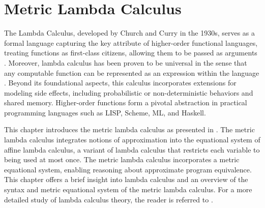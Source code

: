  

 





\chapter{Metric Lambda Calculus} \label{ch:metriclambda}


The Lambda Calculus, developed by Church and Curry in the 1930s, serves as a formal language capturing the key attribute of higher-order functional languages, treating functions as first-class citizens, allowing them to be passed as arguments \cite{barendregt1984lambda}.  Moreover, lambda calculus has been proven to be universal in the sense that any computable function can be represented as an expression within the language \cite{bernays1936alonzo} . Beyond its foundational aspects, this calculus incorporates extensions for modeling side effects, including probabilistic or non-deterministic behaviors and shared memory.  Higher-order functions form a pivotal abstraction in practical programming languages such as LISP, Scheme, ML, and Haskell.


This chapter introduces the metric lambda calculus as presented in \cite{dahlqvist2022syntactic}. The metric lambda calculus integrates notions of
approximation into the equational system of affine lambda calculus, a variant of lambda calculus that restricts each variable to being used at most once. The metric lambda calculus incorporates a metric equational system, enabling reasoning about approximate program equivalence. This chapter offers a brief insight into lambda calculus and an overview of the syntax and metric equational system of the metric lambda calculus. For a more detailed study of lambda calculus theory, the reader is referred to \cite{barendregt1984lambda}.


